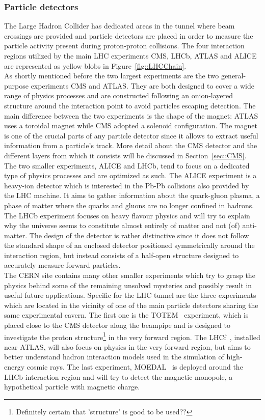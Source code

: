 \subsubsection{Particle detectors}
The Large Hadron Collider has dedicated areas in the tunnel where beam crossings are provided and particle detectors are placed in order to measure the particle activity present during proton-proton collisions. The four interaction regions utilized by the main LHC experiments CMS, LHCb, ATLAS and ALICE are represented as yellow blobs in Figure~\ref{fig::LHCChain}. 
\\
As shortly mentioned before the two largest experiments are the two general-purpose experiments CMS and ATLAS. They are both designed to cover a wide range of physics processes and are constructed following an onion-layered structure around the interaction point to avoid particles escaping detection. The main difference between the two experiments is the shape of the magnet: ATLAS uses a toroidal magnet while CMS adopted a solenoid configuration. The magnet is one of the crucial parts of any particle detector since it allows to extract useful information from a particle's track. More detail about the CMS detector and the different layers from which it consists will be discussed in Section~\ref{sec::CMS}.
\\
The two smaller experiments, ALICE and LHCb, tend to focus on a dedicated type of physics processes and are optimized as such. The ALICE experiment is a heavy-ion detector which is interested in the Pb-Pb collisions also provided by the LHC machine. It aims to gather information about the quark-gluon plasma, a phase of matter where the quarks and gluons are no longer confined in hadrons. The LHCb experiment focuses on heavy flavour physics and will try to explain why the universe seems to constitute almost entirely of matter and not (of) anti-matter. The design of the detector is rather distinctive since it does not follow the standard shape of an enclosed detector positioned symmetrically around the interaction region, but instead consists of a half-open structure designed to accurately measure forward particles.
\\
The CERN site contains many other smaller experiments which try to grasp the physics behind some of the remaining unsolved mysteries and possibly result in useful future applications. 
Specific for the LHC tunnel are the three experiments which are located in the vicinity of one of the main particle detectors sharing the same experimental cavern.
The first one is the TOTEM~\cite{TotemDetectorPaper} experiment, which is placed close to the CMS detector along the beampipe and is designed to investigate the proton structure\footnote{Definitely certain that 'structure' is good to be used??} in the very forward region. The LHCf~\cite{LHCfDetectorPaper}, installed near ATLAS, will also focus on physics in the very forward region, but aims to better understand hadron interaction models used in the simulation of high-energy cosmic rays.
The last experiment, MOEDAL~\cite{MoedalDetectorPaper} is deployed around the LHCb interaction region and will try to detect the magnetic monopole, a hypothetical particle with magnetic charge.

